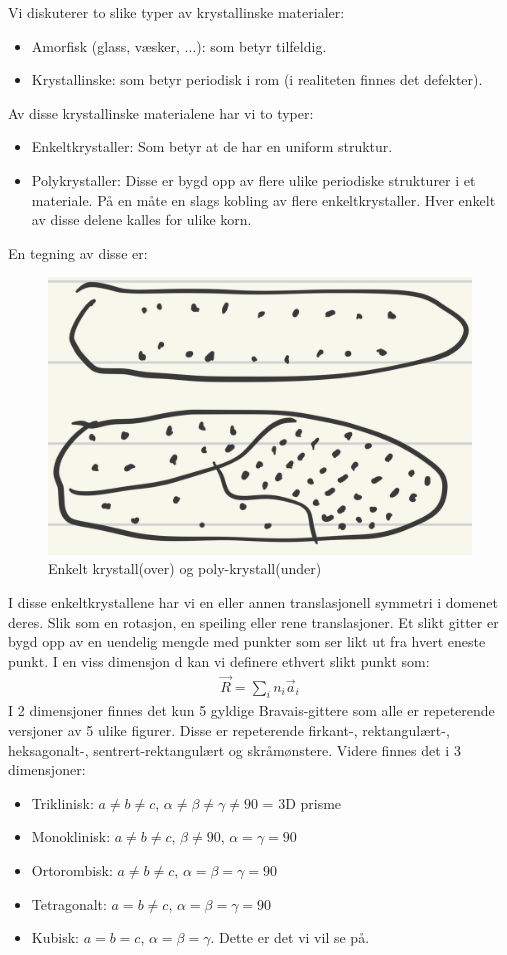 \documentclass{article}
\begin{document}
Vi diskuterer to slike typer av krystallinske materialer:
\begin{itemize}
    \item Amorfisk (glass, væsker, ...): som betyr tilfeldig.
    \item Krystallinske: som betyr periodisk i rom (i realiteten finnes det defekter).
\end{itemize}
Av disse krystallinske materialene har vi to typer:
\begin{itemize}
    \item Enkeltkrystaller: Som betyr at de har en uniform struktur.
    \item Polykrystaller: Disse er bygd opp av flere ulike periodiske strukturer i et materiale. På en måte en slags kobling av flere enkeltkrystaller. Hver enkelt av disse delene kalles for ulike korn. 
\end{itemize}
En tegning av disse er:
\begin{figure}[H]
    \centering
    \includegraphics[width=0.5\linewidth]{bilder/enkelt_poly_krystaller.png}
    \caption{Enkelt krystall(over) og poly-krystall(under)}
    \label{fig:enkelt_poly_krystaller}
\end{figure}
I disse enkeltkrystallene har vi en eller annen translasjonell symmetri i domenet deres. Slik som en rotasjon, en speiling eller rene translasjoner.
Et slikt gitter er bygd opp av en uendelig mengde med punkter som ser likt ut fra hvert eneste punkt. I en viss dimensjon d kan vi definere ethvert slikt punkt som:
\begin{align*}
    \vec{R} = \sum_{i} n_i \vec{a}_i
\end{align*}
I 2 dimensjoner finnes det kun 5 gyldige Bravais-gittere som alle er repeterende versjoner av 5 ulike figurer. Disse er repeterende firkant-, rektangulært-, heksagonalt-, sentrert-rektangulært og skråmønstere. Videre finnes det i 3 dimensjoner:
\begin{itemize}
    \item Triklinisk: $a\ne b\ne c$, $\alpha \ne \beta \ne \gamma \ne 90$ = 3D prisme
    \item Monoklinisk: $a \ne b \ne c$, $\beta \ne 90$, $\alpha = \gamma = 90$
    \item Ortorombisk: $a \ne b \ne c$, $\alpha = \beta = \gamma = 90$
    \item Tetragonalt: $a = b \ne c$, $\alpha = \beta = \gamma = 90$
    \item Kubisk: $a = b = c$, $\alpha = \beta = \gamma$. Dette er det vi vil se på.
\end{itemize}
\end{document}
